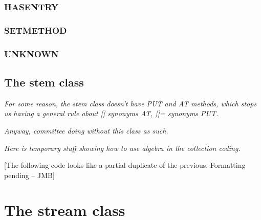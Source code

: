 

\subsubsection{HASENTRY}\label{hasentry}



\subsubsection{SETMETHOD}\label{setmethod}



\subsubsection{UNKNOWN}\label{unknown}



\subsection{The stem class}\label{the-stem-class}

\emph{For some reason, the stem class doesn't have PUT and AT methods,
which stops us having a general rule about {[}{]} synonyms AT, {[}{]}=
synonyms PUT.}

\emph{Anyway, committee doing without this class as such.}

\emph{Here is temporary stuff showing how to use algebra in the
collection coding.}



{[}The following code looks like a partial duplicate of the previous.
Formatting pending -- JMB{]}



\section{The stream class}\label{the-stream-class}

